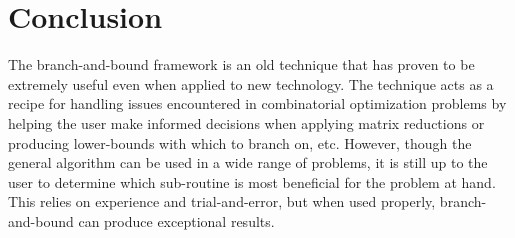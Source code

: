 \section{Conclusion}
	The branch-and-bound framework is an old technique that has proven to be extremely useful even when applied to new technology.
	The technique acts as a recipe for handling issues encountered in combinatorial optimization problems by helping the user make informed decisions when applying matrix reductions or producing lower-bounds with which to branch on, etc. 
	However, though the general algorithm can be used in a wide range of problems, it is still up to the user to determine which sub-routine is most beneficial for the problem at hand. This relies on experience and trial-and-error, but when used properly, branch-and-bound can produce exceptional results.  